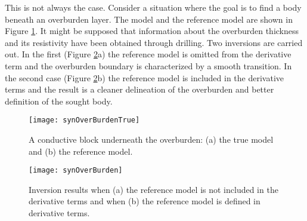 This is not always the case. Consider a situation where the goal is to find a body beneath an overburden layer. The model and the reference model are shown in Figure \ref{fig:synOverBurdenTrue}. It might be supposed that information about the overburden thickness and its resistivity have been obtained through drilling. Two inversions are carried out. In the first (Figure \ref{fig:synOverBurden}a) the reference model is omitted from the derivative term and the overburden boundary is characterized by a smooth transition. In the second case (Figure \ref{fig:synOverBurden}b) the reference model is included in the derivative terms and the result is a cleaner delineation of the overburden and better definition of the sought body.
%
\begin{figure}
\centering
\texttt{[image: synOverBurdenTrue]}
\caption{A conductive block underneath the overburden: (a) the true model and (b) the reference model.}
\label{fig:synOverBurdenTrue}
\end{figure}

\begin{figure}
\centering
\texttt{[image: synOverBurden]}
\caption{Inversion results when (a) the reference model is not included in the derivative terms and when (b) the reference model is defined in derivative terms.}
\label{fig:synOverBurden}
\end{figure}

